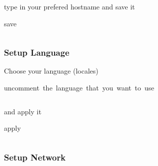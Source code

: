 \documentclass[11pt, a4paper,ngerman]{article}
\begin{document}
type in your prefered hostname and save it \\

\begin{mintedbox}[breakable=true,
 bottomrule=0.5mm,
 width=\paperwidth-3cm,
 boxsep=1mm, 
 enhanced=true,
 colframe = monoblack,
 drop fuzzy shadow,
 colback = black
 ]{save}%
 

     \inputminted[firstline=71,lastline=71, 
     linenos=true, framesep=2mm, mathescape, numbersep=5pt,tabsize=4,%
]{bash}{includes/archlinux.sh}%

\end{mintedbox}%
\vspace{-0.4cm}

\subsubsection{Setup Language}

Choose your language (locales) \\

\begin{mintedbox}[breakable=true,
 bottomrule=0.5mm,
 width=\paperwidth-3cm,
 boxsep=1mm, 
 enhanced=true,
 colframe = monoblack,
 drop fuzzy shadow,
 colback = black
 ]{uncomment\ the\ language\ that\ you\ want\ to\ use}%
 

     \inputminted[firstline=75,lastline=75, 
     linenos=true, framesep=2mm, mathescape, numbersep=5pt,tabsize=4,%
]{bash}{includes/archlinux.sh}%

\end{mintedbox}%
\vspace{0.4cm}

and apply it \\

\begin{mintedbox}[breakable=true,
 bottomrule=0.5mm,
 width=\paperwidth-3cm,
 boxsep=1mm, 
 enhanced=true,
 colframe = monoblack,
 drop fuzzy shadow,
 colback = black
 ]{apply}%
 

     \inputminted[firstline=79,lastline=79, 
     linenos=true, framesep=2mm, mathescape, numbersep=5pt,tabsize=4,%
]{bash}{includes/archlinux.sh}%

\end{mintedbox}%
\vspace{-0.4cm}

\subsubsection{Setup Network}
\end{document}
